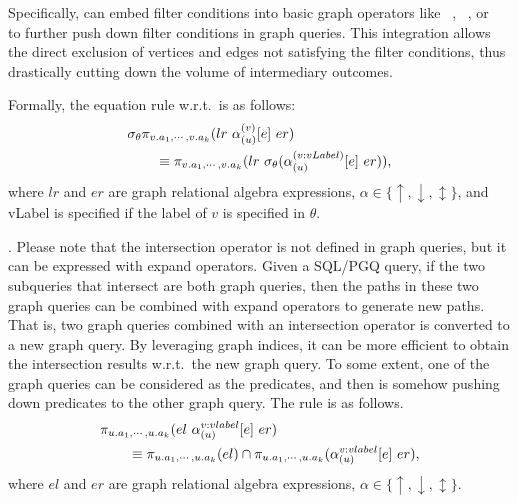 Specifically, \filterrule can embed filter conditions into basic graph operators like \scan~, \expandedge~, or \getvertex~ to further push down filter conditions in graph queries. 
This integration allows the direct exclusion of vertices and edges not satisfying the filter conditions, thus drastically cutting down the volume of intermediary outcomes.

Formally, the equation rule w.r.t.~\filterrule is as follows:
\begin{equation}
    \begin{split}
    & \sigma_{\theta}\pi_{v.a_1, \cdots, v.a_k}(lr~\alpha_{(u)}^{(v)}[e]~er) \\
    & \hspace*{2em} \equiv \pi_{v.a_1, \cdots, v.a_k}(lr~\sigma_{\theta}(\alpha_{(u)}^{(v:vLabel)}[e]~er)), \\
    \end{split}
\end{equation}
where $lr$ and $er$ are graph relational algebra expressions, $\alpha \in \{\uparrow, \downarrow, \updownarrow\}$, and vLabel is specified if the label of $v$ is specified in $\theta$.


\intersectrule. 
Please note that the intersection operator is not defined in graph queries, but it can be expressed with expand operators.
Given a SQL/PGQ query, if the two subqueries that intersect are both graph queries, then the paths in these two graph queries can be combined with expand operators to generate new paths.
That is, two graph queries combined with an intersection operator is converted to a new graph query.
By leveraging graph indices, it can be more efficient to obtain the intersection results w.r.t.~the new graph query.
To some extent, one of the graph queries can be considered as the predicates, and then \intersectrule is somehow pushing down predicates to the other graph query.
The rule is as follows.
\begin{equation}
    \begin{split}
        & \pi_{u.a_1, \cdots, u.a_k}(el~\alpha_{(u)}^{v:vlabel}[e]~er) \\
        & \hspace*{2em} \equiv \pi_{u.a_1, \cdots, u.a_k}(el) \cap \pi_{u.a_1, \cdots, u.a_k}(\alpha_{(u)}^{v:vlabel}[e]~er),
    \end{split}
\end{equation}
where $el$ and $er$ are graph relational algebra expressions, $\alpha \in \{\uparrow, \downarrow, \updownarrow\}$.



